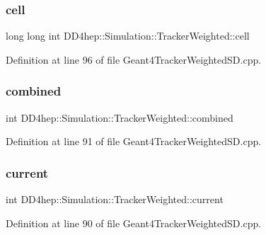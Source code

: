 \subsubsection{\texorpdfstring{cell}{cell}}
{\footnotesize\ttfamily long long int D\+D4hep\+::\+Simulation\+::\+Tracker\+Weighted\+::cell}



Definition at line 96 of file Geant4\+Tracker\+Weighted\+S\+D.\+cpp.

\hypertarget{struct_d_d4hep_1_1_simulation_1_1_tracker_weighted_a7059ba8b2d85cb67220b0184f038f9f9}{}\label{struct_d_d4hep_1_1_simulation_1_1_tracker_weighted_a7059ba8b2d85cb67220b0184f038f9f9} 
\subsubsection{\texorpdfstring{combined}{combined}}
{\footnotesize\ttfamily int D\+D4hep\+::\+Simulation\+::\+Tracker\+Weighted\+::combined}



Definition at line 91 of file Geant4\+Tracker\+Weighted\+S\+D.\+cpp.

\hypertarget{struct_d_d4hep_1_1_simulation_1_1_tracker_weighted_ac6ff7cabaf1b1b455979409184e72966}{}\label{struct_d_d4hep_1_1_simulation_1_1_tracker_weighted_ac6ff7cabaf1b1b455979409184e72966} 
\subsubsection{\texorpdfstring{current}{current}}
{\footnotesize\ttfamily int D\+D4hep\+::\+Simulation\+::\+Tracker\+Weighted\+::current}



Definition at line 90 of file Geant4\+Tracker\+Weighted\+S\+D.\+cpp.

\hypertarget{struct_d_d4hep_1_1_simulation_1_1_tracker_weighted_a77ce382a300e188a9ed772615abfa4f2}{}\label{struct_d_d4hep_1_1_simulation_1_1_tracker_weighted_a77ce382a300e188a9ed772615abfa4f2} 
